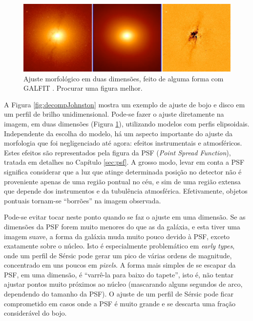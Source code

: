 \begin{figure}
	\includegraphics[width=1.0\textwidth]{figuras/galfit-decomp}
	\caption[Ajuste morfológico em duas dimensões] {\TODO Ajuste morfológico
	em duas dimensões, feito de alguma forma com GALFIT \citep{Peng2002}. Procurar
	uma figura melhor.}
	\label{fig:decompGalfit}
\end{figure}

A Figura \ref{fig:decompJohnston} mostra um exemplo de ajuste de bojo e disco em
um perfil de brilho unidimensional. Pode-se fazer o ajuste diretamente na
imagem, em duas dimensões (Figura \ref{fig:decompGalfit}), utilizando modelos
com perfis elipsoidais. Independente da escolha do modelo, há um aspecto
importante do ajuste da morfologia que foi negligenciado até agora: efeitos
instrumentais e atmosféricos. Estes efeitos são representados pela figura da PSF
({\em Point Spread Function}), tratada em detalhes no Capítulo \ref{sec:psf}. A
grosso modo, levar em conta a PSF significa considerar que a luz que atinge
determinada posição no detector não é proveniente apenas de uma região pontual
no céu, e sim de uma região extensa que depende dos instrumentos e da tubulência
atmosférica. Efetivamente, objetos pontuais tornam-se ``borrões'' na imagem
observada.

Pode-se evitar tocar neste ponto quando se faz o ajuste em uma dimensão.
Se as dimensões da PSF forem muito menores do que as da galáxia, e esta tiver
uma imagem suave, a forma da galáxia muda muito pouco devido à PSF, exceto
exatamente sobre o núcleo. Isto é especialmente problemático em {\em early
types}, onde um perfil de Sérsic pode gerar um pico de várias ordens de
magnitude, concentrado em uns poucos em {\em pixels}. A forma mais simples de se
escapar da PSF, em uma dimensão, é ``varrê-la para baixo do tapete'', isto é,
não tentar ajustar pontos muito próximos ao núcleo (mascarando alguns segundos
de arco, dependendo do tamanho da PSF). O ajuste de um perfil de Sérsic pode
ficar comprometido em casos onde a PSF é muito grande e se descarta uma fração
considerável do bojo.

